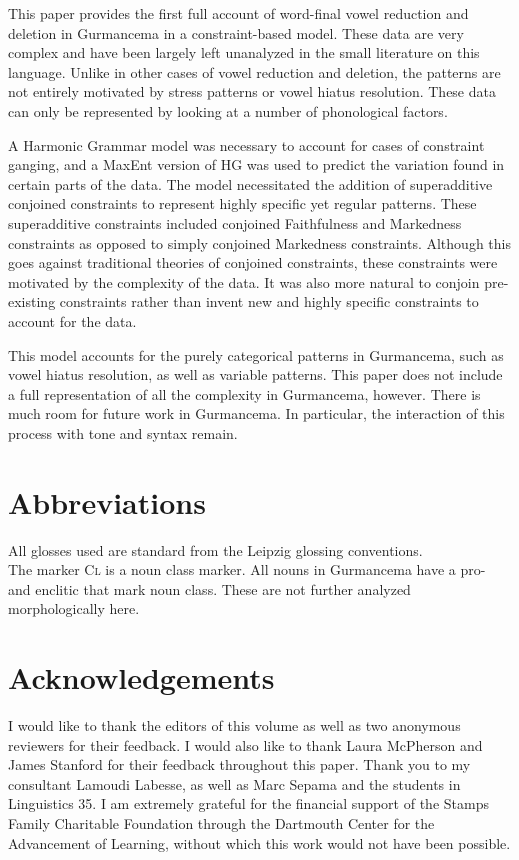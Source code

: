 \documentclass[output=paper,
modfonts
]{langscibook}
\begin{document}
This paper provides the first full account of word-final vowel reduction and deletion in Gurmancema in a constraint-based model. These data are very complex and have been largely left unanalyzed in the small literature on this language. Unlike in other cases of vowel reduction and deletion, the patterns are not entirely motivated by stress patterns or vowel hiatus resolution. These data can only be represented by looking at a number of phonological factors.  
	
A Harmonic Grammar model was necessary to account for cases of constraint ganging, and a MaxEnt version of HG was used to predict the variation found in certain parts of the data. The model necessitated the addition of superadditive conjoined constraints to represent highly specific yet regular patterns. These superadditive constraints included conjoined Faithfulness and Markedness constraints as opposed to simply conjoined Markedness constraints. Although this goes against traditional theories of conjoined constraints, these constraints were motivated by the complexity of the data. It was also more natural to conjoin pre-existing constraints rather than invent new and highly specific constraints to account for the data.   

This model accounts for the purely categorical patterns in Gurmancema, such as vowel hiatus resolution, as well as variable patterns. This paper does not include a full representation of all the complexity in Gurmancema, however. There is much room for future work in Gurmancema. In particular, the interaction of this process with tone and syntax remain. 

\section*{Abbreviations}
All glosses used are standard from the Leipzig glossing conventions. \\
The marker \textsc{Cl} is a noun class marker. All nouns in Gurmancema have a 
pro- and enclitic that mark noun class. These are not further analyzed 
morphologically here. 

\section*{Acknowledgements}

I would like to thank the editors of this volume as well as two anonymous reviewers for their feedback. I would also like to thank Laura McPherson and James Stanford for their feedback throughout this paper. Thank you to my consultant Lamoudi Labesse, as well as Marc Sepama and the 
students in Linguistics 35. I am extremely grateful for the financial support of the Stamps Family Charitable Foundation through the Dartmouth Center for the Advancement of 
Learning, without which this work would not have been possible. 


\printbibliography[heading=subbibliography,notkeyword=this]
\nocite{AlbrightMagri}
\nocite{Boersma96}
\nocite{Casali97}
\nocite{Chantoux}
\nocite{GoldwaterJohnson03}
\nocite{GreenDavis14}
\nocite{HayesWilson08}
\nocite{MoretonSmolensky02}
\nocite{Naba}
\nocite{Rialland80}
\nocite{Rialland01}
\nocite{Ethnologue}
\nocite{Smolensky06}
\nocite{WilsonHayesGeorge08}
\end{document}
